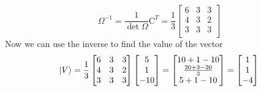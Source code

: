\documentclass[../../../main.tex]{subfiles}
\begin{document}
\begin{equation*}
	\Omega^{-1}=\frac{1}{\det\Omega}\text{C}^T=\frac{1}{3}
	\begin{bmatrix}
		6 & 3 & 3 \\
		4 & 3 & 2 \\
		3 & 3 & 3 \\
	\end{bmatrix}
\end{equation*}
Now we can use the inverse to find the value of the vector
\begin{equation*}
	\ket{V}=\frac{1}{3}
	\begin{bmatrix}
		6 & 3 & 3 \\
		4 & 3 & 2 \\
		3 & 3 & 3 \\
	\end{bmatrix}
	\begin{bmatrix}
		5 \\
		1 \\
		-10
	\end{bmatrix}
	=\begin{bmatrix}
		10+1-10           \\
		\frac{20+3-20}{3} \\
		5+1-10            \\
	\end{bmatrix}
	=
	\begin{bmatrix}
		1 \\
		1 \\
		-4
	\end{bmatrix}
\end{equation*}
\end{document}

